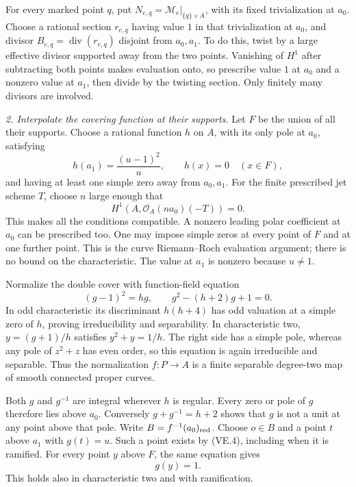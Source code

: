 For every marked point $q$, put
$N_{e,q}=\mathcal M_e|_{\{q\}\times A}$, with its fixed
trivialization at $a_0$. Choose a rational section $r_{e,q}$ having
value $1$ in that trivialization at $a_0$, and divisor
$B_{e,q}=\operatorname{div}(r_{e,q})$ disjoint from $a_0,a_1$.
To do this, twist by a large effective divisor supported away from
the two points. Vanishing of $H^1$ after subtracting both points
makes evaluation onto, so prescribe value $1$ at $a_0$ and a
nonzero value at $a_1$, then divide by the twisting section.
Only finitely many divisors are involved.

\emph{2. Interpolate the covering function at their supports.}
Let $F$ be the union of all their supports. Choose a rational
function $h$ on $A$, with its only pole at $a_0$, satisfying
\begin{equation}
 h(a_1)=\frac{(u-1)^2}{u},\qquad h(x)=0\quad(x\in F),       \tag{VE.3}
\end{equation}
and having at least one simple zero away from $a_0,a_1$.
For the finite prescribed jet scheme $T$, choose $n$ large enough that
\[
                 H^1(A,\mathcal O_A(na_0)(-T))=0.
\]
This makes all the conditions compatible. A nonzero
leading polar coefficient at $a_0$ can be prescribed too.
One may impose simple zeros at every point of $F$ and at one
further point. This is the curve Riemann--Roch evaluation argument;
there is no bound on the characteristic. The value at $a_1$
is nonzero because $u\ne1$.

Normalize the double cover with function-field equation
\begin{equation}
             (g-1)^2=h g,\qquad
                    g^2-(h+2)g+1=0.                    \tag{VE.4}
\end{equation}
In odd characteristic its discriminant $h(h+4)$ has odd valuation
at a simple zero of $h$, proving irreducibility and separability.
In characteristic two, $y=(g+1)/h$ satisfies $y^2+y=1/h$.
The right side has a simple pole, whereas any pole of $z^2+z$
has even order, so this equation is again irreducible and separable.
Thus the normalization $f:P\to A$ is a finite separable degree-two
map of smooth connected proper curves.

Both $g$ and $g^{-1}$ are integral wherever $h$ is regular.
Every zero or pole of $g$ therefore lies above $a_0$.
Conversely $g+g^{-1}=h+2$ shows that $g$ is not a unit at any
point above that pole. Write $B=f^{-1}(a_0)_{\rm red}$.
Choose $o\in B$ and a point $t$ above $a_1$ with $g(t)=u$.
Such a point exists by (VE.4), including when it is ramified.
For every point $y$ above $F$, the same equation gives
\begin{equation}
                              g(y)=1.                    \tag{VE.5}
\end{equation}
This holds also in characteristic two and with ramification.

